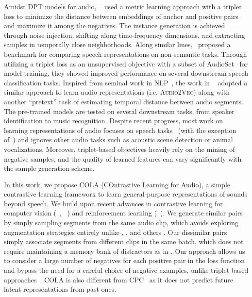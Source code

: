\documentclass{article}
\newcommand{\ours}{COLA }
\begin{document}
Amidst DPT models for audio, ~\cite{jansen2018unsupervised} used a metric learning approach with a triplet loss to minimize the distance between embeddings of anchor and positive pairs and maximize it among the negatives. The instance generation is achieved through noise injection, shifting along time-frequency dimensions, and extracting samples in temporally close neighborhoods. Along similar lines,~\cite{shor2020towards} proposed a benchmark for comparing speech representations on non-semantic tasks. Through utilizing a triplet loss as an unsupervised objective with a subset of AudioSet~\cite{gemmeke2017audio} for model training, they showed improved performance on several downstream speech classification tasks. Inspired from seminal work in NLP~\cite{mikolov2013efficient}, the work in ~\cite{tagliasacchi2019self} adopted a similar approach to learn audio representations (i.e. \textsc{Audio2Vec}) along with another ``pretext'' task of estimating temporal distance between audio segments. The pre-trained models are tested on several downstream tasks, from speaker identification to music recognition.
Despite recent progress, most work on learning representations of audio focuses on speech tasks~\cite{baevski2019vq,riviere2020unsupervised,baevski2020wav2vec} (with the exception of~\cite{jansen2018unsupervised,tagliasacchi2019self}) and ignores other audio tasks such as acoustic scene detection or animal vocalizations. Moreover, triplet-based objectives heavily rely on the mining of negative samples, and the quality of learned features can vary significantly with the sample generation scheme.

In this work, we propose \ours(COntrastive Learning for Audio), a simple contrastive learning framework to learn general-purpose representations of sounds beyond speech. We build upon recent advances in contrastive learning \cite{oord2018representation} for computer vision (~\cite{chen2020simple}, ~\cite{he2020momentum}) and reinforcement learning (~\cite{srinivas2020curl}). We generate similar pairs by simply sampling segments from the same audio clip, which avoids exploring augmentation strategies entirely unlike , ,  and others \cite{ kharitonov2020data}. Our dissimilar pairs simply associate segments from different clips in the same batch, which does not require maintaining a memory bank of distractors as in . Our approach allows us to consider a large number of negatives for each positive pair in the loss function and bypass the need for a careful choice of negative examples, unlike triplet-based approaches~\cite{jansen2018unsupervised, shor2020towards}. \ours is also different from CPC~\cite{oord2018representation} as it does not predict future latent representations from past ones.
\end{document}
